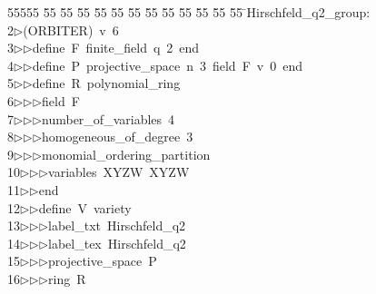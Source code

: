 %
%
\begin{tabbing}
55555 \= 55 \= 55 \= 55 \= 55 \= 55 \= 55 \= 55 \= 55 \= 55 \= 55 \= 55 \= 55 \= \>Hirschfeld\_q2\_group:\\[0pt]
2\>$\triangleright$\>(ORBITER)\ v\ 6\ \\[0pt]
3\>$\triangleright$\>$\triangleright$\>define\ F\ finite\_field\ q\ 2\ end\ \\[0pt]
4\>$\triangleright$\>$\triangleright$\>define\ P\ projective\_space\ n\ 3\ field\ F\ v\ 0\ end\ \\[0pt]
5\>$\triangleright$\>$\triangleright$\>define\ R\ polynomial\_ring\ \\[0pt]
6\>$\triangleright$\>$\triangleright$\>$\triangleright$\>field\ F\ \\[0pt]
7\>$\triangleright$\>$\triangleright$\>$\triangleright$\>number\_of\_variables\ 4\ \\[0pt]
8\>$\triangleright$\>$\triangleright$\>$\triangleright$\>homogeneous\_of\_degree\ 3\ \\[0pt]
9\>$\triangleright$\>$\triangleright$\>$\triangleright$\>monomial\_ordering\_partition\ \\[0pt]
10\>$\triangleright$\>$\triangleright$\>$\triangleright$\>variables\ XYZW\ XYZW\ \\[0pt]
11\>$\triangleright$\>$\triangleright$\>end\ \\[0pt]
12\>$\triangleright$\>$\triangleright$\>define\ V\ variety\ \\[0pt]
13\>$\triangleright$\>$\triangleright$\>$\triangleright$\>label\_txt\ Hirschfeld\_q2\ \\[0pt]
14\>$\triangleright$\>$\triangleright$\>$\triangleright$\>label\_tex\ Hirschfeld\_q2\ \\[0pt]
15\>$\triangleright$\>$\triangleright$\>$\triangleright$\>projective\_space\ P\ \\[0pt]
16\>$\triangleright$\>$\triangleright$\>$\triangleright$\>ring\ R\ \\[0pt]

\end{tabbing}
